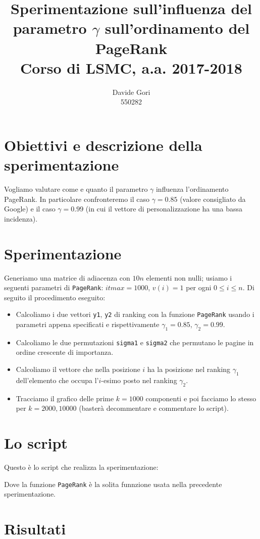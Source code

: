 \documentclass{article}
\title{Sperimentazione sull'influenza del parametro $\gamma$ sull'ordinamento del PageRank\\
	Corso di LSMC, a.a. 2017-2018}
\author{Davide Gori\\
	550282}
\begin{document}
	\maketitle
	
	\section{Obiettivi e descrizione della sperimentazione}
	Vogliamo valutare come e quanto il parametro $\gamma$ influenza l'ordinamento PageRank. In particolare confronteremo il caso $\gamma=0.85$ (valore consigliato da Google) e il caso $\gamma=0.99$ (in cui il vettore di personalizzazione ha una bassa incidenza).\\

	\section{Sperimentazione}
	Generiamo una matrice di adiacenza con $10n$ elementi non nulli; usiamo i seguenti parametri di {\tt PageRank}: $itmax=1000$, $v(i)=1$ per ogni $0 \leq i \leq n$. Di seguito il procedimento eseguito:\\
	\begin{itemize}
		\item Calcoliamo i due vettori {\tt y1}, {\tt y2} di ranking con la funzione {\tt PageRank} usando i parametri appena specificati e rispettivamente $\gamma_1=0.85$, $\gamma_2=0.99$.
		\item Calcoliamo le due permutazioni {\tt sigma1} e {\tt sigma2} che permutano le pagine in ordine crescente di importanza.
		\item Calcoliamo il vettore che nella posizione $i$ ha la posizione nel ranking $\gamma_1$ dell'elemento che occupa l'$i$-esimo posto nel ranking $\gamma_2$.
		\item Tracciamo il grafico delle prime $k=1000$ componenti e poi facciamo lo stesso per $k=2000, 10000$ (basterà decommentare e commentare lo script).
	\end{itemize}
	
	\section{Lo script}
	Questo è lo script che realizza la sperimentazione:
	
	
	
	Dove la funzione {\tt PageRank} è la solita funnzione usata nella precedente sperimentazione.
	\newpage
	\section{Risultati}
	
\end{document}
